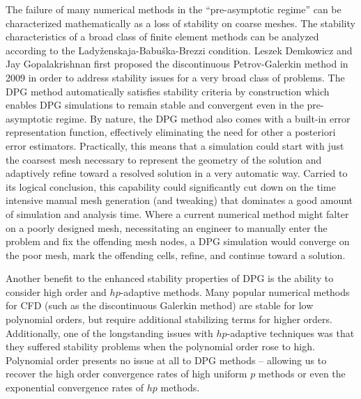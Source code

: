 \documentclass[12pt]{report}
\begin{document}
The failure of many numerical methods in the ``pre-asymptotic regime'' can be characterized mathematically as a loss of stability on coarse meshes.
The stability characteristics of a broad class of finite element methods can be analyzed according to the Lady\v{z}enskaja-Babu\v{s}ka-Brezzi condition.
Leszek Demkowicz and Jay Gopalakrishnan first proposed the discontinuous Petrov-Galerkin method in 2009\cite{DPG1} in order to address stability issues for a 
very broad class of problems. The DPG method automatically satisfies stability criteria by construction which enables DPG simulations to remain stable and 
convergent even in the pre-asymptotic regime. 
By nature, the DPG method also comes with a built-in error representation function, effectively eliminating the need for other a posteriori error estimators.
Practically, this means that a simulation could start with just the coarsest mesh necessary to represent the geometry of the solution and adaptively refine toward a resolved solution in a very automatic way.
Carried to its logical conclusion, this capability could significantly cut down on the time intensive manual mesh generation (and tweaking) that dominates a good amount of simulation and analysis time.
Where a current numerical method might falter on a poorly designed mesh, necessitating an engineer to manually enter the problem and fix the offending mesh nodes, a DPG simulation would converge on the poor mesh, mark the offending cells, refine, and continue toward a solution.

Another benefit to the enhanced stability properties of DPG is the ability to consider high order and $hp$-adaptive methods. 
Many popular numerical methods for CFD (such as the discontinuous Galerkin method) are stable for low polynomial orders, but require additional stabilizing terms for higher orders. 
Additionally, one of the longstanding issues with $hp$-adaptive techniques was that they suffered stability problems when the polynomial order rose to high. 
Polynomial order presents no issue at all to DPG methods -- allowing us to recover the high order convergence rates of high uniform $p$ methods or even the exponential convergence rates of $hp$ methods.
\end{document}

